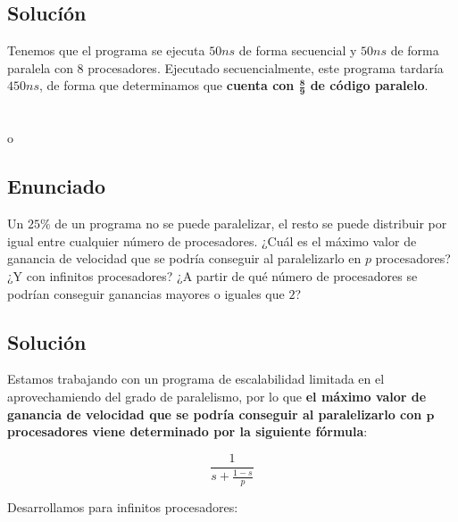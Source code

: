\subsection{Solucíón}

Tenemos que el programa se ejecuta $50ns$ de forma secuencial y $50ns$ de forma paralela con $8$ procesadores.
Ejecutado secuencialmente, este programa tardaría $450ns$, de forma que determinamos que \textbf{cuenta con $\boldsymbol{\frac{8}{9}}$ de código paralelo}.

\section{}\label{ej-2-10}o

\subsection{Enunciado}

Un $25\%$ de un programa no se puede paralelizar, el resto se puede distribuir por igual entre cualquier número de procesadores.
¿Cuál es el máximo valor de ganancia de velocidad que se podría conseguir al paralelizarlo en $p$ procesadores?
¿Y con infinitos procesadores?
¿A partir de qué número de procesadores se podrían conseguir ganancias mayores o iguales que $2$?

\subsection{Solución}

Estamos trabajando con un programa de escalabilidad limitada en el aprovechamiendo del grado de paralelismo, por lo que \textbf{el máximo valor de ganancia de velocidad que se podría conseguir al paralelizarlo con $\boldsymbol{p}$ procesadores viene determinado por la siguiente fórmula}:

\[\frac{1}{s+\frac{1-s}{p}}\]

Desarrollamos para infinitos procesadores:
